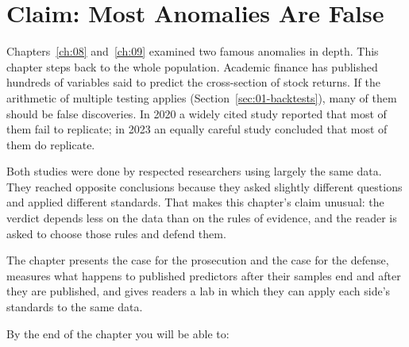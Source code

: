 \makeatletter
{}
\makeatother

\chapter{Claim: Most Anomalies Are False}
\label{ch:10}

Chapters~\ref{ch:08} and~\ref{ch:09} examined two famous anomalies in depth. This chapter steps back to the whole population. Academic finance has published hundreds of variables said to predict the cross-section of stock returns. If the arithmetic of multiple testing applies (Section~\ref{sec:01-backtests}), many of them should be false discoveries. In 2020 a widely cited study reported that most of them fail to replicate; in 2023 an equally careful study concluded that most of them do replicate.

Both studies were done by respected researchers using largely the same data. They reached opposite conclusions because they asked slightly different questions and applied different standards. That makes this chapter's claim unusual: the verdict depends less on the data than on the rules of evidence, and the reader is asked to choose those rules and defend them.

The chapter presents the case for the prosecution and the case for the defense, measures what happens to published predictors after their samples end and after they are published, and gives readers a lab in which they can apply each side's standards to the same data.

By the end of the chapter you will be able to:

